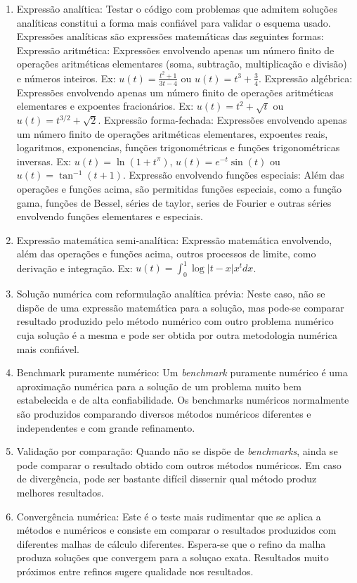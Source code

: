\begin{enumerate}
\item Expressão analítica: Testar o código com problemas que admitem soluções analíticas constitui a forma mais confiável para validar o esquema usado. Expressões analíticas são expressões matemáticas das seguintes formas:
\subitem Expressão aritmética: Expressões envolvendo apenas um número finito de operações aritméticas elementares (soma, subtração, multiplicação e divisão) e números inteiros. Ex: $u(t)=\frac{t^2+1}{3t-4}$ ou $u(t)=t^3+\frac{3}{4}.$
\subitem Expressão algébrica:  Expressões envolvendo apenas um número finito de operações aritméticas elementares e expoentes fracionários. Ex: $u(t)=t^2+ \sqrt{t} $ ou $u(t)=t^{3/2}+\sqrt{2}$. 
\subitem Expressão forma-fechada: Expressões envolvendo apenas um número finito de operações aritméticas elementares, expoentes reais, logaritmos, exponencias, funções trigonométricas e funções trigonométricas inversas. Ex: $u(t)=\ln(1+t^{\pi})$, $u(t)=e^{-t}\sin(t)$ ou $u(t)=\tan^{-1}(t+1)$.
\subitem Expressão envolvendo funções especiais: Além das operações e funções acima, são permitidas funções especiais, como a função gama, funções de Bessel, séries de taylor, series de Fourier e outras séries envolvendo funções elementares e especiais. 
\item Expressão matemática semi-analítica: Expressão matemática envolvendo, além das operações e funções acima, outros processos de limite, como derivação e integração. Ex: $u(t)=\int_{0}^1 \log|t-x|x^t dx$.  
\item Solução numérica com reformulação analítica prévia: Neste caso, não se dispõe de uma expressão matemática para a solução, mas pode-se comparar resultado produzido pelo método numérico com outro problema numérico cuja solução é a mesma e pode ser obtida por outra metodologia numérica mais confiável. 
\item Benchmark puramente numérico: Um {\it benchmark} puramente numérico é uma aproximação numérica para a solução de um problema muito bem estabelecida e de alta confiabilidade. Os benchmarks numéricos normalmente são produzidos comparando diversos métodos numéricos diferentes e independentes e com grande refinamento.
\item Validação por comparação: Quando não se dispõe de {\it benchmarks}, ainda se pode comparar o resultado obtido com outros métodos numéricos. Em caso de divergência, pode ser bastante difícil dissernir qual método produz melhores resultados.
\item Convergência numérica: Este é o teste mais rudimentar que se aplica a métodos e numéricos e consiste em comparar o resultados produzidos com diferentes malhas de cálculo diferentes. Espera-se que o refino da malha produza soluções que convergem para a soluçao exata. Resultados muito próximos entre refinos sugere qualidade nos resultados.
\end{enumerate}



